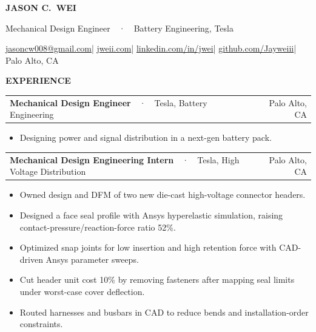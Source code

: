 \documentclass[10pt,letterpaper]{article}
\makeatletter
\renewcommand{\section}[1]{%
  \vspace{6pt}%
  {\color{redline}\ttfamily\footnotesize\bfseries\MakeUppercase{#1}}%
  \hspace{6pt}{\color{muted}\leaders\hrule height 0.4pt\hfill}\par
  \vspace{6pt}}
\newcommand{\job}[4]{%
  \begin{tabularx}{\linewidth}{@{}X r@{}}
    \textbf{#1}\ \ {\color{muted}·}\ \ #2 &
    {\small\color{muted}#3}\quad{\ttfamily\small\leavevmode\color{muted}#4} \\
  \end{tabularx}\par\vspace{1pt}}
\makeatother
\begin{document}
{\fontsize{24}{26}\selectfont\bfseries JASON C.\ WEI}\par
\vspace{3pt}
{\large Mechanical Design Engineer\ \ {\color{muted}·}\ \ Battery Engineering, Tesla}\par
\vspace{4pt}
{\ttfamily\small\color{muted}%
  \href{mailto:jasoncw008@gmail.com}{jasoncw008@gmail.com}\enspace|\enspace
  \href{https://jweii.com}{jweii.com}\enspace|\enspace
  \href{https://linkedin.com/in/jwei}{linkedin.com/in/jwei}\enspace|\enspace
  \href{https://github.com/Jayweiii}{github.com/Jayweiii}\enspace|\enspace
  Palo Alto, CA%
}\par
\vspace{2pt}
\vspace{1pt}{\color{ink}\rule{\linewidth}{1.2pt}}

\section{Experience}

\job{Mechanical Design Engineer}{Tesla, Battery Engineering}{Palo Alto, CA}{Jul 2025 \textendash\ Present}
\begin{itemize}
  \item Designing power and signal distribution in a next-gen battery pack.
\end{itemize}

\job{Mechanical Design Engineering Intern}{Tesla, High Voltage Distribution}{Palo Alto, CA}{Jun 2024 \textendash\ Sep 2024}
\begin{itemize}
  \item Owned design and DFM of two new die-cast high-voltage connector headers.
  \item Designed a face seal profile with Ansys hyperelastic simulation, raising contact-pressure/reaction-force ratio 52\%.
  \item Optimized snap joints for low insertion and high retention force with CAD-driven Ansys parameter sweeps.
  \item Cut header unit cost 10\% by removing fasteners after mapping seal limits under worst-case cover deflection.
  \item Routed harnesses and busbars in CAD to reduce bends and installation-order constraints.
\end{itemize}
\end{document}
